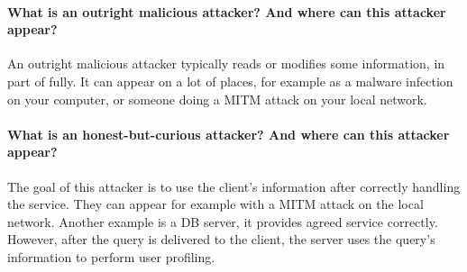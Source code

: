 \paragraph{What is an outright malicious attacker? And where can this attacker appear?}
An outright malicious attacker typically reads or modifies some information, in part of fully. It can appear on a lot of places, for example as a malware infection on your computer, or someone doing a MITM attack on your local network.

\paragraph{What is an honest-but-curious attacker? And where can this attacker appear?}
The goal of this attacker is to use the client's information after correctly handling the service. They can appear for example with a MITM attack on the local network. Another example is a DB server, it provides agreed service correctly. However, after the query is delivered to the client, the server uses the query's information to perform user profiling.